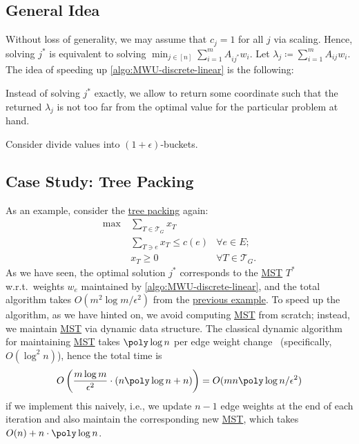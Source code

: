 \subsection{General Idea}
Without loss of generality, we may assume that \(c_j = 1\) for all \(j\) via scaling. Hence, solving \(j^{\ast} \) is equivalent to solving \(\min _{j \in [n]} \sum_{i=1}^{m} A_{ij^{\ast} } w_i\). Let \(\lambda _j \coloneqq \sum_{i=1}^{m} A_{ij} w_i\). The idea of speeding up \autoref{algo:MWU-discrete-linear} is the following:

\begin{intuition}
	Instead of solving \(j^{\ast} \) exactly, we allow to return some coordinate such that the returned \(\lambda _j\) is not too far from the optimal value for the particular problem at hand.
\end{intuition}

\begin{eg}
	Consider divide values into \((1 + \epsilon )\)-buckets.
\end{eg}

\subsection{Case Study: Tree Packing}
As an example, consider the \hyperref[eg:tree-packing-MWU]{tree packing} again:
\[
	\begin{aligned}
		\max~ & \sum_{T \in \mathcal{T} _G} x_T                                 \\
		      & \sum_{T \ni e} x_T \leq c(e)    & \forall e \in E ;             \\
		      & x_T \geq 0                      & \forall T \in \mathcal{T} _G.
	\end{aligned}
\]
As we have seen, the optimal solution \(j^{\ast} \) corresponds to the \hyperref[prb:MST]{MST} \(T^{\ast} \) w.r.t.\ weights \(w_e\) maintained by \autoref{algo:MWU-discrete-linear}, and the total algorithm takes \(O(m^2 \log m / \epsilon ^2)\) from the \hyperref[eg:tree-packing-MWU-implementation]{previous example}. To speed up the algorithm, as we have hinted on, we avoid computing \hyperref[prb:MST]{MST} from scratch; instead, we maintain \hyperref[prb:MST]{MST} via dynamic data structure. The classical dynamic algorithm for maintaining \hyperref[prb:MST]{MST} takes \(\poly \log n\) per edge weight change~\cite{holm2001poly} (specifically, \(O(\log ^2 n)\)), hence the total time is
\[
	O\left( \frac{m \log m}{\epsilon ^2} \cdot (n \poly \log n + n) \right)
	= O(mn \poly \log n / \epsilon ^2)
\]
if we implement this naively, i.e., we update \(n-1\) edge weights at the end of each iteration and also maintain the corresponding new \hyperref[prb:MST]{MST}, which takes \(O(n) + n \cdot \poly \log n\).

